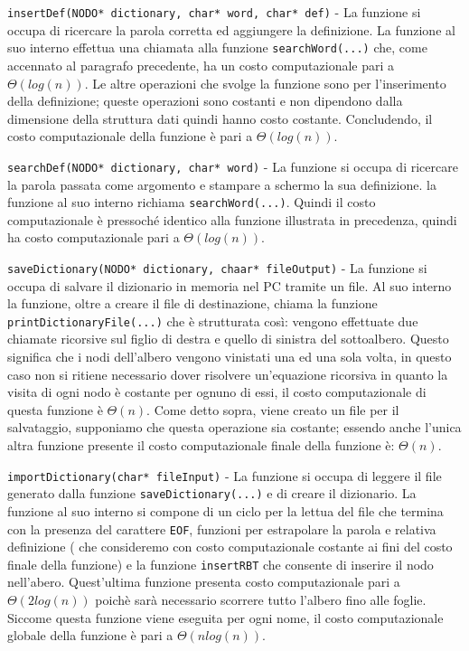 \documentclass[paper=a4, fontsize=11pt,twoside]{scrartcl}   %
\begin{document}
				\texttt{insertDef(NODO* dictionary, char* word, char* def)} - La funzione si occupa di ricercare la parola corretta ed aggiungere la definizione. La funzione al suo interno effettua una chiamata alla funzione \texttt{searchWord(...)} che, come accennato al paragrafo precedente, ha un costo computazionale pari a $\Theta(log(n))$. Le altre operazioni che svolge la funzione sono per l'inserimento della definizione; queste operazioni sono costanti e non dipendono dalla dimensione della struttura dati quindi hanno costo costante. Concludendo, il costo computazionale della funzione è pari a $\Theta(log(n))$.\par
				
				\texttt{searchDef(NODO* dictionary, char* word)} - La funzione si occupa di ricercare la parola passata come argomento e stampare a schermo la sua definizione. la funzione al suo interno richiama \texttt{searchWord(...)}. Quindi il costo computazionale è pressoché identico alla funzione illustrata in precedenza, quindi ha costo computazionale pari a $\Theta(log(n))$.\par
				
				\texttt{saveDictionary(NODO* dictionary, chaar* fileOutput)} - La funzione si occupa di salvare il dizionario in memoria nel PC tramite un file. Al suo interno la funzione, oltre a creare il file di destinazione, chiama la funzione \texttt{printDictionaryFile(...)} che è strutturata così: vengono effettuate due chiamate ricorsive sul figlio di destra e quello di sinistra del sottoalbero. Questo significa che i nodi dell'albero vengono vinistati una ed una sola volta, in questo caso non si ritiene necessario dover risolvere un'equazione ricorsiva in quanto la visita di ogni nodo è costante per ognuno di essi, il costo computazionale di questa funzione è $\Theta(n)$. Come detto sopra, viene creato un file per il salvataggio, supponiamo che questa operazione sia costante; essendo anche l'unica altra funzione presente il costo computazionale finale della funzione è: $\Theta(n)$.\par
				
				\texttt{importDictionary(char* fileInput)} - La funzione si occupa di leggere il file generato dalla funzione \texttt{saveDictionary(...)} e di creare il dizionario. La funzione al suo interno si compone di un ciclo per la lettua del file che termina con la presenza del carattere \texttt{EOF}, funzioni per estrapolare la parola e relativa definizione ( che consideremo con costo computazionale costante ai fini del costo finale della funzione) e la funzione \texttt{insertRBT} che consente di inserire il nodo nell'abero. Quest'ultima funzione presenta costo computazionale pari a $\Theta(2log(n))$ poichè sarà necessario scorrere tutto l'albero fino alle foglie. Siccome questa funzione viene eseguita per ogni nome, il costo computazionale globale della funzione è pari a $\Theta(nlog(n))$.\par 
				
\end{document}
